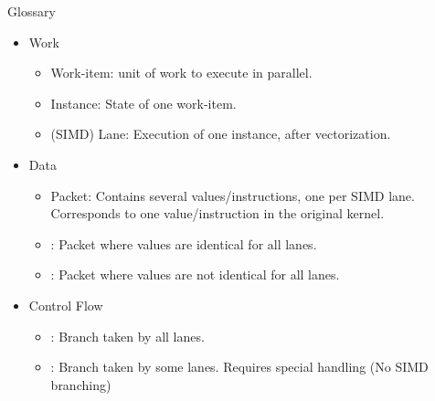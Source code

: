 \begin{frame}{Glossary}

\begin{itemize}
    \item Work
    \begin{itemize}
        \item Work-item: unit of work to execute in parallel.
        \item Instance: State of one work-item.
        \item (SIMD) Lane: Execution of one instance, after vectorization.
        \end{itemize}
        
    \item Data
    \begin{itemize}
        \item Packet: Contains several values/instructions, one per SIMD lane. Corresponds to one value/instruction in the original kernel.
        \item {}: Packet where values are identical for all lanes.
        \item {}: Packet where values are not identical for all lanes.
        \end{itemize}

    \item Control Flow
    \begin{itemize}
        \item {}: Branch taken by all lanes.
        \item {}: Branch taken by some lanes. Requires special handling (No SIMD branching)
    \end{itemize}
\end{itemize}

\end{frame}


